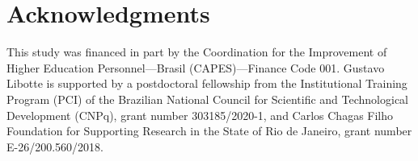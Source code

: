 \documentclass[final,5p,times,twocolumn,numbers]{elsarticle}
\begin{document}


\section*{Acknowledgments}

\noindent This study was financed in part by the Coordination for the Improvement of Higher Education Personnel---Brasil (CAPES)---Finance Code 001. Gustavo Libotte is supported by a postdoctoral fellowship from the Institutional Training Program (PCI) of the Brazilian National Council for Scientific and Technological Development (CNPq), grant number 303185/2020-1, and Carlos Chagas Filho Foundation for Supporting Research in the State of Rio de Janeiro, grant number E-26/200.560/2018.

 

\end{document}
